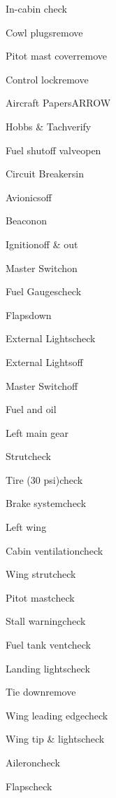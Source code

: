  




\begin{multicols}{2}
\begin{checklist}{In-cabin check}
  \item{Cowl plugs}{remove}
  \item{Pitot mast cover}{remove}
  \item{Control lock}{remove}
  \item{Aircraft Papers}{ARROW}
  \item{Hobbs \& Tach}{verify}
  \item{Fuel shutoff valve}{open}
  \item{Circuit Breakers}{in}
  \item{Avionics}{off}
  \item{Beacon}{on}
  \item{Ignition}{off \& out}
  \item{Master Switch}{on}
  \item{Fuel Gauges}{check}
  \item{Flaps}{down}
  \item{External Lights}{check}
  \item{External Lights}{off}
  \item{Master Switch}{off}
\end{checklist}

\begin{checklist}{Fuel and oil}
\end{checklist}

\begin{checklist}{Left main gear}
  \item{Strut}{check}
  \item{Tire (30 psi)}{check}
  \item{Brake system}{check}
\end{checklist}

\begin{checklist}{Left wing}
  \item{Cabin ventilation}{check}
  \item{Wing strut}{check}
  \item{Pitot mast}{check}
  \item{Stall warning}{check}
  \item{Fuel tank vent}{check}
  \item{Landing lights}{check}
  \item{Tie down}{remove}
  \item{Wing leading edge}{check}
  \item{Wing tip \& lights}{check}
  \item{Aileron}{check}
  \item{Flaps}{check}
\end{checklist}


\end{multicols}
